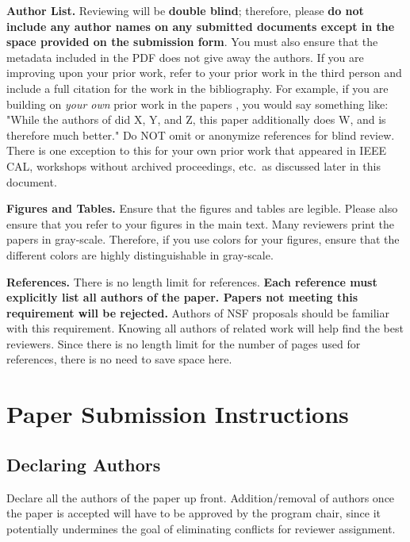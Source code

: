 \documentclass[pageno]{jpaper}
\begin{document}
\noindent\textbf{Author List.}  Reviewing will be \textbf{double blind};
therefore, please \textbf{do not include any author names on any submitted
documents except in the space provided on the submission form}.  You must
also ensure that the metadata included in the PDF does not give away the
authors. If you are improving upon your prior work, refer to your prior
work in the third person and include a full citation for the work in the
bibliography.  For example, if you are building on {\em your own} prior
work in the papers \cite{nicepaper1,nicepaper2,nicepaper3}, you would say
something like: "While the authors of
\cite{nicepaper1,nicepaper2,nicepaper3} did X, Y, and Z, this paper
additionally does W, and is therefore much better."  Do NOT omit or
anonymize references for blind review.  There is one exception to this for
your own prior work that appeared in IEEE CAL, workshops without archived
proceedings, etc.\, as discussed later in this document.

\noindent\textbf{Figures and Tables.} Ensure that the figures and tables
are legible.  Please also ensure that you refer to your figures in the main
text.  Many reviewers print the papers in gray-scale. Therefore, if you use
colors for your figures, ensure that the different colors are highly
distinguishable in gray-scale.

\noindent\textbf{References.}  There is no length limit for references.
{\bf Each reference must explicitly list all authors of the paper.  Papers
not meeting this requirement will be rejected.} Authors of NSF proposals
should be familiar with this requirement. Knowing all authors of related
work will help find the best reviewers. Since there is no length limit
for the number of pages used for references, there is no need to save space
here.

\section{Paper Submission Instructions}

\subsection{Declaring Authors}

Declare all the authors of the paper up front. Addition/removal of authors
once the paper is accepted will have to be approved by the program chair,
since it potentially undermines the goal of eliminating conflicts for
reviewer assignment.
\end{document}
